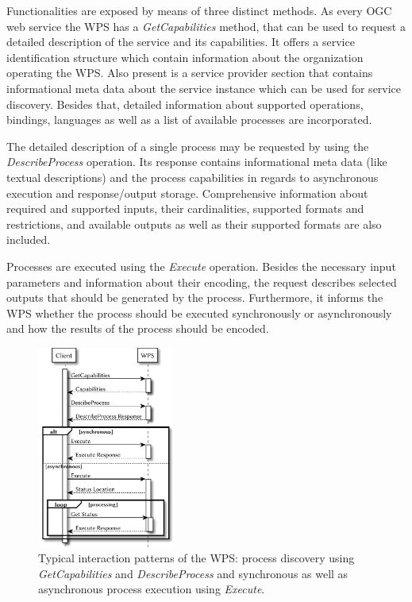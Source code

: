 	Functionalities are exposed by means of three distinct methods. As every \ac{OGC} web service the \ac{WPS} has a \emph{GetCapabilities} method, that can be used to request a detailed description of the service and its capabilities. It offers a service identification structure which contain information about the organization operating the \ac{WPS}.  Also present is a service provider section that contains informational meta data about the service instance which can be used for service discovery. Besides that, detailed information about supported operations, bindings, languages as well as a list of available processes are incorporated.

	The detailed description of a single process may be requested by using the \emph{DescribeProcess} operation. Its response contains informational meta data (like textual descriptions) and the process capabilities in regards to asynchronous execution and response/output storage. Comprehensive information about required and supported inputs, their cardinalities, supported formats and restrictions, and available outputs as well as their supported formats are also included.

	Processes are executed using the \emph{Execute} operation. Besides the necessary input parameters and information about their encoding, the request describes selected outputs that should be generated by the process. Furthermore, it informs the \ac{WPS} whether the process should be executed synchronously or asynchronously and how the results of the process should be encoded.

	\begin{figure}[!htb]
		\centering
		\includegraphics[width=0.40140845070422537\textwidth]{figures/sequence-diagramm-wps.pdf}
		\caption{\label{fig:sd:wps}Typical interaction patterns of the \acl{WPS}: process discovery using \emph{GetCapabilities} and \emph{DescribeProcess} and synchronous as well as asynchronous process execution using \emph{Execute}.}
	\end{figure}


